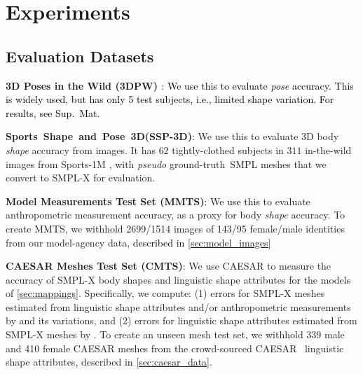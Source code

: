 \documentclass[10pt,twocolumn,letterpaper]{article}
\newcommand{\qheading}[1]{\noindent\textbf{#1}:}
\newcommand{\TODO}[1]{\xspace{\color{red} #1}\xspace}
\renewcommand{\TODO}[1]{\xspace{\color{black} #1}\xspace}
\newcommand{\AtoS}{\text{\mbox{A2S}}\xspace}
\newcommand{\StoA}{\text{\mbox{S2A}}\xspace}
\newcommand{\threeD}{3D\xspace}
\newcommand{\mmts}{MMTS\xspace}
\newcommand{\cmts}{CMTS\xspace}
\newcommand{\ssp}{\mbox{SSP-\threeD}\xspace}
\newcommand{\ssplong}{\mbox{Sports Shape and Pose \threeD}\xspace}
\newcommand{\smplx}{\mbox{SMPL-X}\xspace}
\newcommand{\smplX}{\smplx}
\newcommand{\groundtruth}{\mbox{ground-truth}\xspace}
\newcommand{\smpl}{\mbox{SMPL}\xspace}
\newcommand{\caesar}{\mbox{CAESAR}\xspace}
\newcommand{\inthewild}{\mbox{in-the-wild}\xspace}
\newcommand{\supmat}{{\mbox{\textcolor{black}{Sup.~Mat.}}}\xspace}
\newcommand{\threedpw}{\mbox{3DPW}\xspace}
\renewcommand{\ie}{\mbox{i.e.}\xspace}
\newcommand{\cameraready}[1]{\textcolor{Fuchsia}{{#1}}\xspace}
\renewcommand{\cameraready}[1]{\textcolor{black}{{#1}}\xspace}
\newcommand{\colorTERM}{blue}
\renewcommand{\colorTERM}{black}
\newcommand{\measurement}[0]{{\color{\colorTERM}anthropometric measurement}\xspace}
\newcommand{\measurements}[0]{{\color{\colorTERM}anthropometric measurements}\xspace}
\newcommand{\linguisticshapeattributes}[0]{{\color{\colorTERM}linguistic shape attributes}\xspace}
\begin{document}
 \section{Experiments}
\label{sec:experiments}

\subsection{Evaluation Datasets}     \label{sec:exp_datasets}




\qheading{\threeD Poses in the Wild (\threedpw) \cite{vonMarcard2018}}
\cameraready{We use this to evaluate \emph{pose} accuracy. 
This is widely used, but has only 5 test subjects, \ie, limited shape variation. 
For results, see \supmat}


\qheading{\ssplong (\ssp)\cite{sengupta2020straps}}
We use this to evaluate \threeD body \emph{shape} accuracy  from images. 
It has $62$ tightly-clothed subjects in $311$ \inthewild images from 
\mbox{Sports-1M} \cite{KarpathyCVPR14}, 
with \emph{pseudo} \groundtruth~\smpl meshes that we \TODO{convert} to \smplX for evaluation. 


\qheading{Model Measurements Test Set (\mmts)}
We \cameraready{use this}
to evaluate 
\measurement accuracy,
as a proxy for body \emph{shape} accuracy.
To create \mmts, we withhold
2699/1514 images of 143/95 female/male identities from our 
model-agency
data, \cameraready{described in \cref{sec:model_images}}


\qheading{\caesar Meshes Test Set (\cmts)} 
We use \caesar to measure the accuracy of \smplX body shapes and \linguisticshapeattributes
\cameraready{for} 
the models
of \cref{sec:mappings}.
Specifically, we compute:
(1) errors for \smplx meshes estimated from \linguisticshapeattributes and/or \measurements by \AtoS and its variations, and
(2) errors for \linguisticshapeattributes estimated from \smplX meshes by \StoA.
To create an unseen mesh test set, we withhold 339 male and 410 female \caesar meshes from the crowd-sourced \caesar~ \linguisticshapeattributes, described in \cref{sec:caesar_data}.
\end{document}
